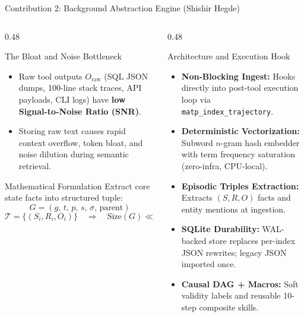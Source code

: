 \documentclass[aspectratio=169,10pt]{beamer}
\begin{document}
\begin{frame}{Contribution 2: Background Abstraction Engine (Shishir Hegde)}
  \begin{columns}[T,onlytextwidth]
    \begin{column}{0.48\textwidth}
      \begin{block}{The Bloat and Noise Bottleneck}
        \begin{itemize}
          \footnotesize
          \item Raw tool outputs $O_{\mathrm{raw}}$ (SQL JSON dumps, 100-line stack traces, API payloads, CLI logs) have \textbf{low Signal-to-Noise Ratio (SNR)}.
          \item Storing raw text causes rapid context overflow, token bloat, and noise dilution during semantic retrieval.
        \end{itemize}
      \end{block}
      \begin{block}{Mathematical Formulation}
        \footnotesize
        Extract core state facts into structured tuple:
        \[
          G = (g,\, t,\, p,\, s,\, \sigma,\, \text{parent})
        \]
        \[
          \mathcal{T} = \{(S_i, R_i, O_i)\} \quad \Longrightarrow \quad \mathrm{Size}(G) \ll \mathrm{Size}(O_{\mathrm{raw}})
        \]
      \end{block}
    \end{column}
    \begin{column}{0.48\textwidth}
      \begin{block}{Architecture and Execution Hook}
        \begin{itemize}
          \footnotesize
          \item \textbf{Non-Blocking Ingest:} Hooks directly into post-tool execution loop via \texttt{matp\_index\_trajectory}.
          \item \textbf{Deterministic Vectorization:} Subword $n$-gram hash embedder with term frequency saturation (zero-infra, CPU-local).
          \item \textbf{Episodic Triples Extraction:} Extracts $(S, R, O)$ facts and entity mentions at ingestion.
          \item \textbf{SQLite Durability:} WAL-backed store replaces per-index JSON rewrites; legacy JSON imported once.
          \item \textbf{Causal DAG + Macros:} Soft validity labels and reusable 10-step composite skills.
        \end{itemize}
      \end{block}
    \end{column}
  \end{columns}
\end{frame}
\end{document}
